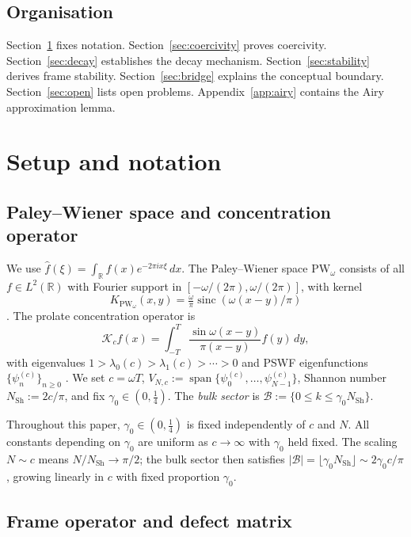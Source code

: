\documentclass[12pt,a4paper]{amsart}
\theoremstyle{definition}
\newcommand{\PW}{\mathrm{PW}_\omega}
\newcommand{\Kop}{\mathcal{K}_c}
\newcommand{\psin}{\psi_n^{(c)}}
\begin{document}
\subsection*{Organisation}
Section~\ref{sec:setup} fixes notation.
Section~\ref{sec:coercivity} proves coercivity.
Section~\ref{sec:decay} establishes the decay mechanism.
Section~\ref{sec:stability} derives frame stability.
Section~\ref{sec:bridge} explains the conceptual boundary.
Section~\ref{sec:open} lists open problems.
Appendix~\ref{app:airy} contains the Airy approximation lemma.

\section{Setup and notation}\label{sec:setup}

\subsection{Paley--Wiener space and concentration operator}

We use $\widehat{f}(\xi)=\int_{\mathbb{R}}f(x)e^{-2\pi ix\xi}\,dx$.
The Paley--Wiener space $\PW$ consists of all $f\in L^2(\mathbb{R})$
with Fourier support in $[-\omega/(2\pi),\omega/(2\pi)]$, with kernel
\[
  K_{\PW}(x,y)
  =\tfrac{\omega}{\pi}\operatorname{sinc}(\omega(x-y)/\pi)
\]
\cite{BonamiKaroui}. The prolate concentration operator is
\[
  \Kop f(x)=\int_{-T}^{T}\frac{\sin\omega(x-y)}{\pi(x-y)}f(y)\,dy,
\]
with eigenvalues $1>\lambda_0(c)>\lambda_1(c)>\cdots>0$ and PSWF
eigenfunctions $\{\psin\}_{n\ge 0}$ \cite{Slepian1978}. We set
$c=\omega T$, $V_{N,c}:=\operatorname{span}\{\psi_0^{(c)},\dots,
\psi_{N-1}^{(c)}\}$, Shannon number $N_{\mathrm{Sh}}:=2c/\pi$, and
fix $\gamma_0\in(0,\tfrac{1}{4})$. The \emph{bulk sector} is
$\mathcal{B}:=\{0\le k\le\gamma_0 N_{\mathrm{Sh}}\}$.

Throughout this paper, $\gamma_0\in(0,\tfrac{1}{4})$ is fixed
independently of $c$ and $N$. All constants depending on $\gamma_0$
are uniform as $c\to\infty$ with $\gamma_0$ held fixed.
The scaling $N\sim c$ means $N/N_{\mathrm{Sh}}\to\pi/2$; the bulk
sector then satisfies $|\mathcal{B}|=\lfloor\gamma_0
N_{\mathrm{Sh}}\rfloor\sim 2\gamma_0 c/\pi$, growing linearly in $c$
with fixed proportion $\gamma_0$.

\subsection{Frame operator and defect matrix}
\end{document}
